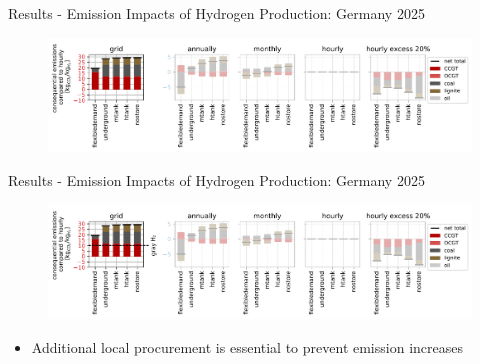 \begin{frame}{Results - Emission Impacts of Hydrogen Production: Germany 2025}
	\begin{figure}
		\centering
		\includegraphics[width=1\linewidth]{images/consequential_emissions_by_carrier_3200wmonthly_v0.pdf}
	\end{figure}
\end{frame}


\begin{frame}{Results - Emission Impacts of Hydrogen Production: Germany 2025}
	\addtocounter{framenumber}{-1}
	\begin{figure}
		\centering
		\includegraphics[width=1\linewidth]{images/consequential_emissions_by_carrier_3200wmonthly_v1.pdf}
	\end{figure}
	\begin{itemize}
		\item \alert{Additional local procurement} is \alert{essential} to prevent emission increases
	\end{itemize}
\end{frame}


